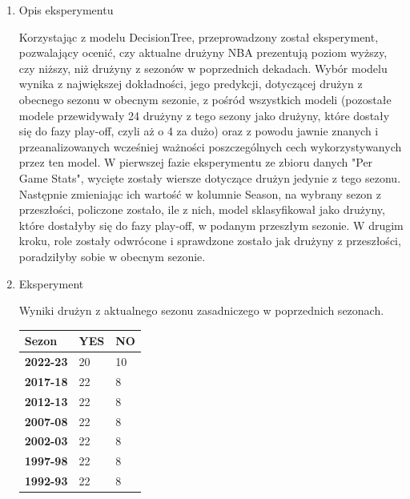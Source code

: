 \documentclass{article}
\begin{document}
    \begin{enumerate}
        \item Opis eksperymentu
        
        Korzystając z modelu DecisionTree, przeprowadzony został eksperyment, pozwalający ocenić, czy aktualne drużyny NBA prezentują poziom wyższy, czy niższy, niż drużyny z sezonów w poprzednich dekadach. Wybór modelu wynika z największej dokładności, jego predykcji, dotyczącej drużyn z obecnego sezonu w obecnym sezonie, z pośród wszystkich modeli (pozostałe modele przewidywały 24 drużyny z tego sezony jako drużyny, które dostały się do fazy play-off, czyli aż o 4 za dużo) oraz z powodu jawnie znanych i przeanalizowanych wcześniej ważności poszczególnych cech wykorzystywanych przez ten model.
        W pierwszej fazie eksperymentu ze zbioru danych "Per Game Stats", wycięte zostały wiersze dotyczące drużyn jedynie z tego sezonu. Następnie zmieniając ich wartość w kolumnie Season, na wybrany sezon z przeszłości, policzone zostało, ile z nich, model sklasyfikował jako drużyny, które dostałyby się do fazy play-off, w podanym przeszłym sezonie. W drugim kroku, role zostały odwrócone i sprawdzone zostało jak drużyny z przeszłości, poradziłyby sobie w obecnym sezonie.

        \item Eksperyment

        Wyniki drużyn z aktualnego sezonu zasadniczego w poprzednich sezonach.

        \begin{table}[H]
            \centering
            \begin{tabular}{|l|l|l|}
            \hline
            \textbf{Sezon} & \textbf{YES} & \textbf{NO}  \\ \hline
            \textbf{2022-23} & 20 & 10  \\ \hline
            \textbf{2017-18} & 22 & 8  \\ \hline
            \textbf{2012-13} & 22 & 8  \\ \hline
            \textbf{2007-08} & 22 & 8  \\ \hline
            \textbf{2002-03} & 22 & 8  \\ \hline
            \textbf{1997-98} & 22 & 8  \\ \hline
            \textbf{1992-93} & 22 & 8  \\ \hline
            \end{tabular}
        \end{table}


\end{enumerate}
\end{document}
